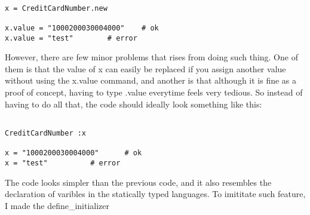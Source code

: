 \begin{lstlisting}[caption={declaration of variables example}]

x = CreditCardNumber.new

x.value = "1000200030004000"	# ok
x.value = "test"		# error

\end{lstlisting}

However, there are few minor problems that rises from doing such thing.  One of them is that the value of x can easily be replaced if you assign another value without using the x.value command, and another is that although it is fine as a proof of concept, having to type .value everytime feels very tedious.  So instead of having to do all that, the code should ideally look something like this:

\begin{lstlisting}[caption={declaration of variables example}]

CreditCardNumber :x

x = "1000200030004000"		# ok
x = "test"			# error

\end{lstlisting}

The code looks simpler than the previous code, and it also resembles the declaration of varibles in the statically typed languages.  To imititate such feature, I made the define\_initializer

